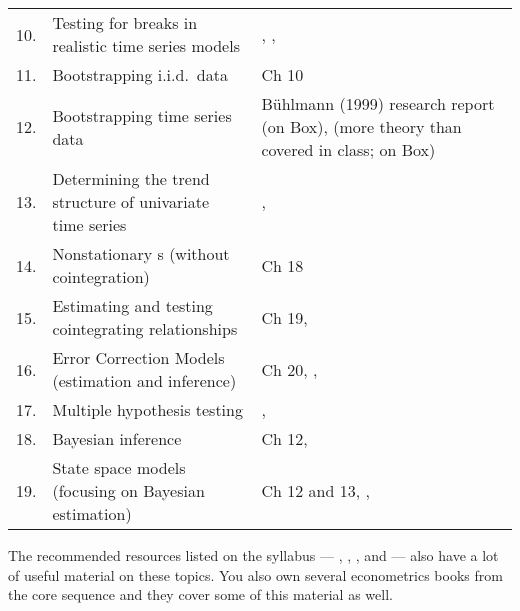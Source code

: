 \documentclass[nofonts,nols]{tufte-handout}
\renewcommand{\allcaps}[1]{\textls{\MakeUppercase{#1}}}
\newcommand{\VAR}{\allcaps{VAR}}
\begin{document}
\begin{table*}[h]
\begin{tabularx}{\textwidth}{rXX}
    10. & Testing for breaks in realistic time series models                     & \citep{An03}, \citep{Ba97}, \citep{BP98}                                                                \\
    11. & Bootstrapping i.i.d.\ data                                             & \citep{Ha14} Ch 10                                                                                      \\
    12. & Bootstrapping time series data                                         & B\"{u}hlmann (1999) research report (on Box), \citep{HHK03} (more theory than covered in class; on Box) \\
    13. & Determining the trend structure of univariate time series              & \citep{AB00}, \citep{HLT07}                                                                             \\
    14. & Nonstationary \VAR s (without cointegration)                           & \citep{Ha94} Ch 18                                                                                      \\
    15. & Estimating and testing cointegrating relationships                     & \citep{Ha94} Ch 19,  \citep{Jo14}                                                                       \\
    16. & Error Correction Models (estimation and inference)                     & \citep{Ha94} Ch 20, \citep{Da13}, \citep{Jo14}                                                          \\
    17. & Multiple hypothesis testing                                            & \citep{RW05}, \citep{Ro08}                                                                              \\
    18. & Bayesian inference                                                     & \citep{Ha94} Ch 12, \citep{Ch12}                                                                        \\
    19. & State space models (focusing on Bayesian estimation)                   & \citep{Ha94} Ch 12 and 13, \citep{Fe11}, \citep{Ch12}                                                   \\
    \bottomrule
  \end{tabularx}
\end{table*}

\begin{fullwidth}
\noindent%
The recommended resources listed on the syllabus --- \citep{Lu06},
\citep{Ca07}, \citep{MS08}, and \citep{SW08} --- also have a lot of
useful material on these topics. You also own several econometrics
books from the core sequence and they cover some of this material as
well.



\end{fullwidth}
\end{document}
